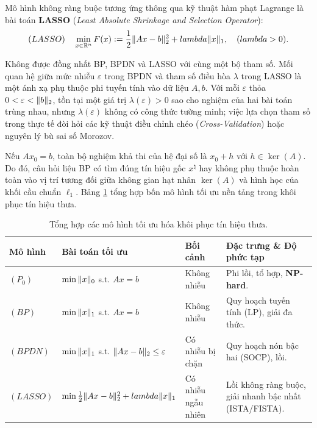Mô hình không ràng buộc tương ứng thông qua kỹ thuật hàm phạt Lagrange là bài toán \textbf{LASSO} (\emph{Least Absolute Shrinkage and Selection Operator}):
\begin{equation}
    (LASSO) \quad \min_{x \in \mathbb{R}^n} F(x) \mathrel{\mathop:}= \frac{1}{2} \|Ax - b\|_2^2 + lambda \|x\|_1, \quad (lambda > 0).
\end{equation}

\begin{remark}
Không được đồng nhất BP, BPDN và LASSO với cùng một bộ tham số. Mối quan hệ giữa mức nhiễu $\varepsilon$ trong BPDN và tham số điều hòa $\lambda$ trong LASSO là một ánh xạ phụ thuộc phi tuyến tính vào dữ liệu $A, b$. Với mỗi $\varepsilon$ thỏa $0 < \varepsilon < \|b\|_2$, tồn tại một giá trị $\lambda(\varepsilon) > 0$ sao cho nghiệm của hai bài toán trùng nhau, nhưng $\lambda(\varepsilon)$ không có công thức tường minh; việc lựa chọn tham số trong thực tế đòi hỏi các kỹ thuật điều chỉnh chéo (\emph{Cross-Validation}) hoặc nguyên lý bù sai số Morozov.
\end{remark}

Nếu $Ax_0 = b$, toàn bộ nghiệm khả thi của hệ đại số là $x_0 + h$ với $h \in \ker(A)$. Do đó, câu hỏi liệu BP có tìm đúng tín hiệu gốc $x^\natural$ hay không phụ thuộc hoàn toàn vào vị trí tương đối giữa không gian hạt nhân $\ker(A)$ và hình học của khối cầu chuẩn $\ell_1$. Bảng \ref{tab:opt_models_summary} tổng hợp bốn mô hình tối ưu nền tảng trong khôi phục tín hiệu thưa.

\begin{table}[htbp]
\centering
\small
\caption{Tổng hợp các mô hình tối ưu hóa khôi phục tín hiệu thưa.}
\label{tab:opt_models_summary}
\begin{tabular}{p{1.8cm}p{4.3cm}p{2.7cm}p{4.5cm}}
\toprule
\textbf{Mô hình} & \textbf{Bài toán tối ưu} & \textbf{Bối cảnh} & \textbf{Đặc trưng \& Độ phức tạp} \\
\midrule
$(P_0)$ & $\min \|x\|_0$ s.t. $Ax = b$ & Không nhiễu & Phi lồi, tổ hợp, \textbf{NP-hard}. \\[0.15cm]
$(BP)$ & $\min \|x\|_1$ s.t. $Ax = b$ & Không nhiễu & Quy hoạch tuyến tính (LP), giải đa thức. \\[0.15cm]
$(BPDN)$ & $\min \|x\|_1$ s.t. $\|Ax - b\|_2 \le \varepsilon$ & Có nhiễu bị chặn & Quy hoạch nón bậc hai (SOCP), lồi. \\[0.15cm]
$(LASSO)$ & $\min \frac{1}{2}\|Ax - b\|_2^2 + lambda \|x\|_1$ & Có nhiễu ngẫu nhiên & Lồi không ràng buộc, giải nhanh bậc nhất (ISTA/FISTA). \\
\bottomrule
\end{tabular}
\end{table}


